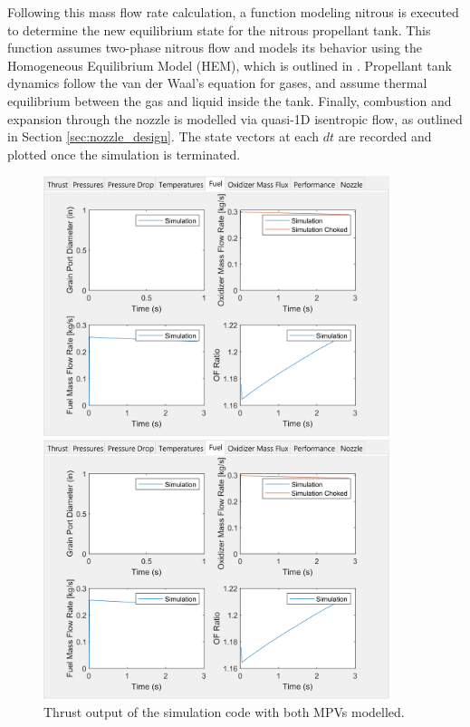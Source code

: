 \documentclass[9pt]{article} %
\numberwithin{equation}{section} %
\begin{document}
Following this mass flow rate calculation, a function modeling nitrous is executed to determine the new equilibrium state for the nitrous propellant tank. This function assumes two-phase nitrous flow and models its behavior using the Homogeneous Equilibrium Model (HEM), which is outlined in \cite{stanford}. Propellant tank dynamics follow the van der Waal's equation for gases, and assume thermal equilibrium between the gas and liquid inside the tank. Finally, combustion and expansion through the nozzle is modelled via quasi-1D isentropic flow, as outlined in Section \ref{sec:nozzle_design}. The state vectors at each $dt$ are recorded and plotted once the simulation is terminated.

\begin{figure}
    \centering
    \begin{minipage}{0.49\textwidth}
        \centering
        \includegraphics[scale=0.5, width=0.9\textwidth, trim={0cm 0cm 0cm 0cm}, clip]{system_sim_files/stanford_valve_oldmass_thrust.png} %
        \caption{Thrust output of the simulation code with both MPVs modelled.}
        \label{fig:stanford_valve_old_thrust}
    \end{minipage}\hfill
    \begin{minipage}{0.49\textwidth}
        \centering
        \includegraphics[scale=0.5, width=0.9\textwidth, trim={0cm 0cm 0cm 0cm}, clip]{system_sim_files/stanford_valve_oldmass_fuel.png} %

\end{minipage}
\end{figure}
\end{document}
